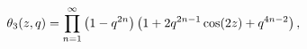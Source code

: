 \[\mathop{\theta_{3}\/}\nolimits\!\left(z,q\right)=\prod\limits_{n=1}^{\infty}%
\left(1-q^{2n}\right)\left(1+2q^{2n-1}\mathop{\cos\/}\nolimits\!\left(2z\right%
)+q^{4n-2}\right),\]
